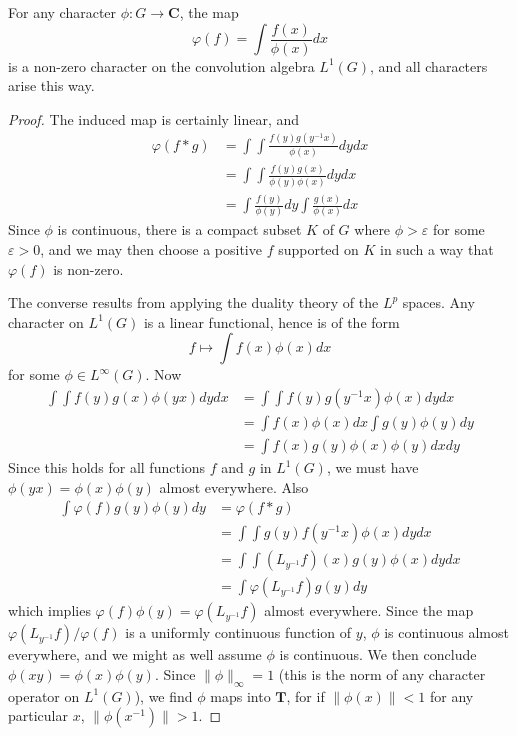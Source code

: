 \begin{theorem}
    For any character $\phi: G \to \mathbf{C}$, the map
    \[ \varphi(f) = \int \frac{f(x)}{\phi(x)} dx \]
    is a non-zero character on the convolution algebra $L^1(G)$, and all characters arise this way.
\end{theorem}
\begin{proof}
    The induced map is certainly linear, and
    \begin{align*}
        \varphi(f * g) &= \int \int \frac{f(y) g(y^{-1}x)}{\phi(x)} dy dx\\
        &= \int \int \frac{f(y) g(x)}{\phi(y) \phi(x)} dy dx\\
        &= \int \frac{f(y)}{\phi(y)} dy \int \frac{g(x)}{\phi(x)} dx
    \end{align*}
    Since $\phi$ is continuous, there is a compact subset $K$ of $G$ where $\phi > \varepsilon$ for some $\varepsilon > 0$, and we may then choose a positive $f$ supported on $K$ in such a way that $\varphi(f)$ is non-zero.

    The converse results from applying the duality theory of the $L^p$ spaces. Any character on $L^1(G)$ is a linear functional, hence is of the form
    \[ f \mapsto \int f(x) \phi(x) dx \]
    for some $\phi \in L^\infty(G)$. Now
    \begin{align*}
        \int \int f(y) g(x) \phi(yx) dy dx &= \int \int f(y) g(y^{-1}x) \phi(x) dy dx\\
        &= \int f(x) \phi(x) dx \int g(y) \phi(y) dy\\
        &= \int f(x) g(y) \phi(x) \phi(y) dx dy
    \end{align*}
    Since this holds for all functions $f$ and $g$ in $L^1(G)$, we must have $\phi(yx) = \phi(x) \phi(y)$ almost everywhere. Also
    \begin{align*}
        \int \varphi(f) g(y) \phi(y) dy &= \varphi(f * g)\\
        &= \int \int g(y) f(y^{-1}x) \phi(x) dy dx\\
        &= \int \int (L_{y^{-1}} f)(x) g(y) \phi(x) dy dx\\
        &= \int \varphi(L_{y^{-1}} f) g(y) dy
    \end{align*}
    which implies $\varphi(f) \phi(y) = \varphi(L_{y^{-1}} f)$ almost everywhere. Since the map $\varphi(L_{y^{-1}} f)/\varphi(f)$ is a uniformly continuous function of $y$, $\phi$ is continuous almost everywhere, and we might as well assume $\phi$ is continuous. We then conclude $\phi(xy) = \phi(x) \phi(y)$. Since $\| \phi \|_\infty = 1$ (this is the norm of any character operator on $L^1(G)$), we find $\phi$ maps into $\mathbf{T}$, for if $\| \phi(x) \| < 1$ for any particular $x$, $\| \phi(x^{-1}) \| > 1$.
\end{proof}

